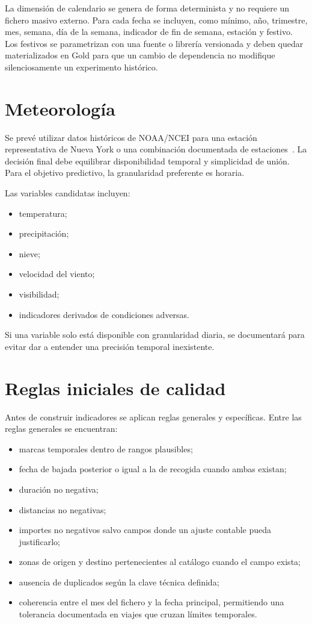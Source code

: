 La dimensión de calendario se genera de forma determinista y no requiere un fichero masivo externo. Para cada fecha se incluyen, como mínimo, año, trimestre, mes, semana, día de la semana, indicador de fin de semana, estación y festivo. Los festivos se parametrizan con una fuente o librería versionada y deben quedar materializados en Gold para que un cambio de dependencia no modifique silenciosamente un experimento histórico.

\section{Meteorología}

Se prevé utilizar datos históricos de NOAA/NCEI para una estación representativa de Nueva York o una combinación documentada de estaciones~\cite{noaa_ncei}. La decisión final debe equilibrar disponibilidad temporal y simplicidad de unión. Para el objetivo predictivo, la granularidad preferente es horaria.

Las variables candidatas incluyen:

\begin{itemize}
\item temperatura;
\item precipitación;
\item nieve;
\item velocidad del viento;
\item visibilidad;
\item indicadores derivados de condiciones adversas.
\end{itemize}

Si una variable solo está disponible con granularidad diaria, se documentará para evitar dar a entender una precisión temporal inexistente.

\section{Reglas iniciales de calidad}

Antes de construir indicadores se aplican reglas generales y específicas. Entre las reglas generales se encuentran:

\begin{itemize}
\item marcas temporales dentro de rangos plausibles;
\item fecha de bajada posterior o igual a la de recogida cuando ambas existan;
\item duración no negativa;
\item distancias no negativas;
\item importes no negativos salvo campos donde un ajuste contable pueda justificarlo;
\item zonas de origen y destino pertenecientes al catálogo cuando el campo exista;
\item ausencia de duplicados según la clave técnica definida;
\item coherencia entre el mes del fichero y la fecha principal, permitiendo una tolerancia documentada en viajes que cruzan límites temporales.
\end{itemize}

